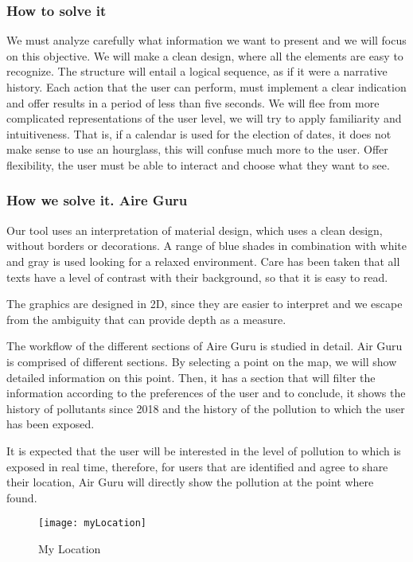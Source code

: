 \subsubsection{How to solve it} 
We must analyze carefully what information we want to present and we will focus on this objective. We will make a
clean design, where all the elements are easy to recognize.
The structure will entail a logical sequence, as if it were a narrative history.
Each action that the user can perform, must implement a clear indication and offer results in a
period of less than five seconds.
We will flee from more complicated representations of the user level, we will try to apply familiarity and intuitiveness.
That is, if a calendar is used for the election of dates, it does not make sense to use an hourglass, this will confuse
much more to the user.
Offer flexibility, the user must be able to interact and choose what they want to see.

\subsubsection{How we solve it. Aire Guru} 
Our tool uses an interpretation of material design, which uses a clean design, without borders or decorations.
A range of blue shades in combination with white and gray is used looking for a relaxed environment.
Care has been taken that all texts have a level of contrast with their background, so that it is easy to read.

The graphics are designed in 2D, since they are easier to interpret and we escape from the ambiguity that can
provide depth as a measure.


The workflow of the different sections of Aire Guru is studied in detail.
Air Guru is comprised of different sections. By selecting a point on the map, we
will show detailed information on this point. Then, it has a section that will filter the information according to the preferences of the user
and to conclude, it shows the history of pollutants since 2018 and the history of the pollution to which the user has been
exposed.

It is expected that the user will be interested in the level of pollution to which is exposed in real time, therefore, for users
that are identified and agree to share their location, Air Guru will directly show the pollution at the point where
found.

\begin{figure}[ht]
    \centering
    \texttt{[image: myLocation]}
    \caption{My Location}
\end{figure}

